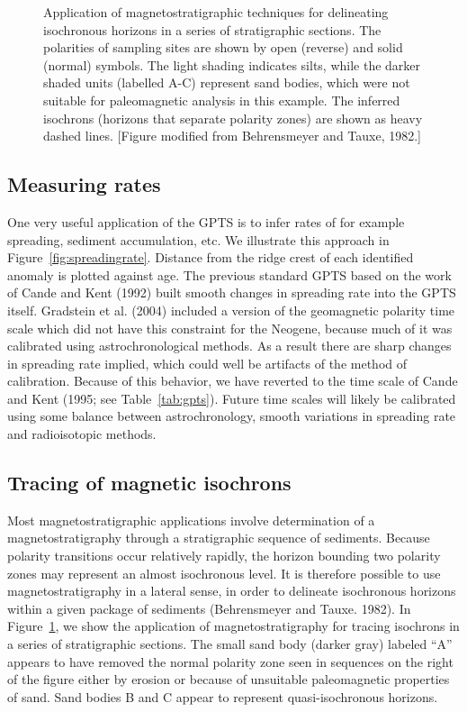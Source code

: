 \begin{figure}[htb]
\epsfxsize 12cm
\centering {}
\caption{Application of magnetostratigraphic techniques for delineating
isochronous horizons in a series of stratigraphic sections.  The
polarities of sampling sites are shown by open (reverse) and solid
(normal) symbols.  The light shading indicates   silts, while the
darker shaded units (labelled A-C)  represent sand bodies, 
which were not suitable for paleomagnetic analysis in this example. 
The inferred isochrons (horizons that separate 
polarity zones) are shown as heavy dashed lines. [Figure modified from Behrensmeyer and Tauxe, 1982.]}
\label{fig:isochron}
\end{figure}


\subsection{Measuring rates}

One very useful application of the GPTS is to infer rates of for example spreading, sediment accumulation, etc.   We illustrate this approach in Figure~\ref{fig:spreadingrate}.  Distance from the ridge crest of each identified anomaly is plotted against age.  The previous standard GPTS based on the work of  Cande and Kent (1992) \nocite{cande92} built smooth changes in spreading rate into the GPTS itself.   Gradstein et al. (2004)  included a version of the geomagnetic polarity time scale which  did not have this constraint for the Neogene, because much of it was calibrated using astrochronological methods.  As a result there are sharp changes in spreading rate implied, which could well be artifacts of the method of calibration.   Because of this behavior, we have reverted to the time scale of Cande and Kent (1995; see Table~\ref{tab:gpts}).    Future time scales will likely be calibrated using some balance between astrochronology, smooth variations in  spreading  rate and radioisotopic methods.       

\subsection{Tracing of magnetic isochrons}

Most magnetostratigraphic applications involve determination of a
magnetostratigraphy through a stratigraphic sequence of
sediments.  Because polarity transitions occur relatively rapidly, the horizon bounding two polarity
zones may represent an almost isochronous level.   
It is therefore possible to use magnetostratigraphy in a lateral
sense, in order to delineate isochronous horizons within a given package
of sediments 
(Behrensmeyer and 
Tauxe. 1982).  \nocite{behrensmeyer82}
In Figure~\ref{fig:isochron}, we show the application of
magnetostratigraphy for tracing isochrons in a series of stratigraphic 
sections.   The small sand body (darker gray) labeled ``A'' appears
 to have removed  the normal polarity zone seen in sequences on the right of the
figure either by erosion or because of unsuitable paleomagnetic properties 
of sand.  
Sand bodies B and C appear to represent quasi-isochronous horizons. 

